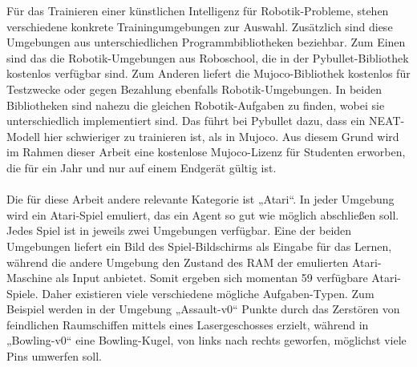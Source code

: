 Für das Trainieren einer künstlichen Intelligenz für Robotik-Probleme, stehen verschiedene konkrete Trainingumgebungen zur Auswahl. Zusätzlich sind diese Umgebungen aus unterschiedlichen Programmbibliotheken beziehbar. Zum Einen sind das die Robotik-Umgebungen aus Roboschool, die in der Pybullet-Bibliothek kostenlos verfügbar sind. Zum Anderen liefert die Mujoco-Bibliothek kostenlos für Testzwecke oder gegen Bezahlung ebenfalls Robotik-Umgebungen. In beiden Bibliotheken sind nahezu die gleichen Robotik-Aufgaben zu finden, wobei sie unterschiedlich implementiert sind. Das führt bei Pybullet dazu, dass ein NEAT-Modell hier schwieriger zu trainieren ist, als in Mujoco. Aus diesem Grund wird im Rahmen dieser Arbeit eine kostenlose Mujoco-Lizenz für Studenten erworben, die für ein Jahr und nur auf einem Endgerät gültig ist.
\\
\\
Die für diese Arbeit andere relevante Kategorie ist „Atari“. In jeder Umgebung wird ein Atari-Spiel emuliert, das ein Agent so gut wie möglich abschließen soll. Jedes Spiel ist in jeweils zwei Umgebungen verfügbar. Eine der beiden Umgebungen liefert ein Bild des Spiel-Bildschirms als Eingabe für das Lernen, während die andere Umgebung den Zustand des RAM der emulierten Atari-Maschine als Input anbietet. Somit ergeben sich momentan 59 verfügbare Atari-Spiele. Daher existieren viele verschiedene mögliche Aufgaben-Typen. Zum Beispiel werden in der Umgebung „Assault-v0“ Punkte durch das Zerstören von feindlichen Raumschiffen mittels eines Lasergeschosses erzielt, während in „Bowling-v0“ eine Bowling-Kugel, von links nach rechts geworfen, möglichst viele Pins umwerfen soll.

